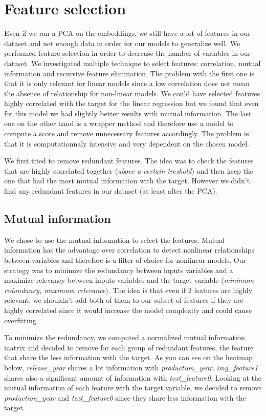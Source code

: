 \section{Feature selection}

Even if we ran a PCA on the embeddings, we still have a lot of features in our dataset and not enough data in order for our models to generalize well. We performed feature selection in order to decrease the number of variables in our dataset. We investigated multiple technique to select features: correlation, mutual information and recursive feature elimination. The problem with the first one is that it is only relevant for linear models since a low correlation does not mean the absence of relationship for non-linear models. We could have selected features highly correlated with the target for the linear regression but we found that even for this model we had slightly better results with mutual information. The last one on the other hand is a wrapper method and therefore use a model to compute a score and remove unnecessary features accordingly. The problem is that it is computationnaly intensive and very dependent on the chosen model.

We first tried to remove redundant features. The idea was to check the features that are highly correlated together (\textit{above a certain treshold}) and then keep the one that had the most mutual information with the target. However we didn't find any redundant features in our dataset (at least after the PCA).

\subsection{Mutual information}

We chose to use the mutual information to select the features. Mutual information has the advantage over correlation to detect nonlinear relationships between variables and therefore is a filter of choice for nonlinear models. Our strategy was to minimize the redundancy between inputs variables and a maximize relevancy between inputs variables and the target variable (\textit{minimum redundancy, maximum relevance}). The idea is that even if $2$ features are highly relevant, we shouldn't add both of them to our subset of features if they are highly correlated since it would increase the model complexity and could cause overfitting.

To minimize the redundancy, we computed a normalized mutual information matrix and decided to remove for each group of redundant features, the feature that share the less information with the target. As you can see on the heatmap below, \textit{release_year} shares a lot information with \textit{production_year}. \textit{img_feature1} shares also a significant amount of information with \textit{text_feature0}. Looking at the mutual information of each feature with the target variable, we decided to remove \textit{production_year} and \textit{text_feature0} since they share less information with the target.

